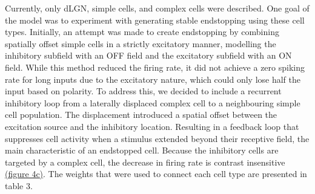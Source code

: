 \documentclass[12pt]{article}
\begin{document}
Currently, only dLGN, simple cells, and complex cells were described. One goal of the model was to experiment with generating stable endstopping using these cell types. Initially, an attempt was made to create endstopping by combining spatially offset simple cells in a strictly excitatory manner, modelling the inhibitory subfield with an OFF field and the excitatory subfield with an ON field. While this method reduced the firing rate, it did not achieve a zero spiking rate for long inputs due to the excitatory nature, which could only lose half the input based on polarity. To address this, we decided to include a recurrent inhibitory loop from a laterally displaced complex cell to a neighbouring simple cell population. The displacement introduced a spatial offset between the excitation source and the inhibitory location. Resulting in a feedback loop that suppresses cell activity when a stimulus extended beyond their receptive field, the main characteristic of an endstopped cell. Because the inhibitory cells are targeted by a complex cell, the decrease in firing rate is contrast insensitive \hyperref[fig:LIF_connectivity]{(figure 4c)}. The weights that were used to connect each cell type are presented in table 3.  
\end{document}
